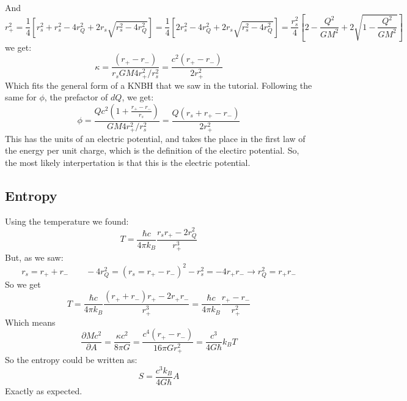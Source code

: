 \documentclass{article}
\begin{document}
And
\begin{equation}
    r_{+}^2 = \frac{1}{4}\left[r_s^2 + r_s^2 - 4r_Q^2 + 2r_s\sqrt{r_s^2 - 4r_Q^2}\right] = 
    \frac{1}{4}\left[2r_s^2 - 4r_Q^2 + 2r_s\sqrt{r_s^2 - 4r_Q^2}\right] = \frac{r_s^2}{4}\left[
        2 - \frac{Q^2}{GM^2} + 2\sqrt{1 - \frac{Q^2}{GM^2}}
    \right]
\end{equation}
we get:
\begin{equation}
    \kappa = \frac{\left(r_{+} - r_{-}\right)}{r_s GM 4
    r_{+}^2/r_s^2} = \frac{c^2\left(r_{+} - r_{-}\right)}{
    2r_{+}^2}
\end{equation}
Which fits the general form of a KNBH that we saw in the tutorial.
Following the same for $\phi$, the prefactor of $dQ$, we get:
\begin{equation}
    \phi = \frac{Qc^2(1 + \frac{r_{+} - r_{-}}{r_s})}{GM 4
    r_{+}^2/r_s^2} = \frac{Q\left(r_s + r_{+} - r_{-}\right)}{2r_{+}^2}
\end{equation}
This has the units of an electric potential, and takes the place in the first law of the energy per unit charge, which is the definition of the electirc potential. So, the most likely interpertation is that this is the electric potential.
\subsection{Entropy}
Using the temperature we found:
\begin{equation}
    T = \frac{\hbar c}{4\pi k_B}\frac{r_sr_{+} - 2r_Q^2}{r_{+}^3}
\end{equation}
But, as we saw:
\begin{equation}
    r_s = r_{+} + r_{-}
    \qquad
    -4r_Q^2 = (r_s = r_{+} - r_{-})^2 - r_s^2 = -4r_{+}r_{-} \rightarrow r_Q^2 = r_{+}r_{-}
\end{equation}
So we get
\begin{equation}
    T = \frac{\hbar c}{4\pi k_B}\frac{(r_{+} + r_{-})r_{+} - 2r_{+}r_{-}}{r_{+}^3} = 
    \frac{\hbar c}{4\pi k_B}\frac{r_{+} - r_{-}}{r_{+}^2}
\end{equation}
Which means
\begin{equation}
    \frac{\partial Mc^2}{\partial A} = \frac{\kappa c^2}{8 \pi G} = \frac{c^4(r_{+} - r_{-})}{16 \pi G r_{+}^2} = \frac{c^3}{4 G \hbar}k_B T
\end{equation}
So the entropy could be written as:
\begin{equation}
    S = \frac{c^3 k_B}{4 G \hbar}A
\end{equation}
Exactly as expected.
\end{document}
